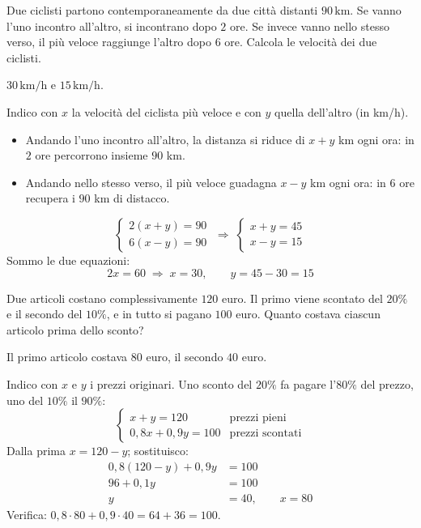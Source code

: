 
\begin{question}[ID=3.9, subtitle={Due ciclisti}, difficulty=difficile, tags={sistemi, problemi, moto}]
Due ciclisti partono contemporaneamente da due città distanti $90\,\text{km}$. Se vanno l'uno incontro all'altro, si incontrano dopo $2$ ore. Se invece vanno nello stesso verso, il più veloce raggiunge l'altro dopo $6$ ore. Calcola le velocità dei due ciclisti.
\begin{solution}
$30\,\text{km/h}$ e $15\,\text{km/h}$.
\end{solution}
\begin{explanation}
Indico con $x$ la velocità del ciclista più veloce e con $y$ quella dell'altro (in km/h).
\begin{itemize}
    \item Andando l'uno incontro all'altro, la distanza si riduce di $x+y$ km ogni ora: in $2$ ore percorrono insieme $90$ km.
    \item Andando nello stesso verso, il più veloce guadagna $x-y$ km ogni ora: in $6$ ore recupera i $90$ km di distacco.
\end{itemize}
\[ \begin{cases} 2(x+y)=90\\ 6(x-y)=90\end{cases} \;\Longrightarrow\; \begin{cases} x+y=45\\ x-y=15\end{cases} \]
Sommo le due equazioni:
\[ 2x=60 \;\Rightarrow\; x=30, \qquad y=45-30=15 \]
\end{explanation}
\end{question}


\begin{question}[ID=3.10, subtitle={Prezzi scontati}, difficulty=difficile, tags={sistemi, problemi, percentuali}]
Due articoli costano complessivamente $120$ euro. Il primo viene scontato del $20\%$ e il secondo del $10\%$, e in tutto si pagano $100$ euro. Quanto costava ciascun articolo prima dello sconto?
\begin{solution}
Il primo articolo costava $80$ euro, il secondo $40$ euro.
\end{solution}
\begin{explanation}
Indico con $x$ e $y$ i prezzi originari. Uno sconto del $20\%$ fa pagare l'$80\%$ del prezzo, uno del $10\%$ il $90\%$:
\[ \begin{cases} x+y=120 & \text{prezzi pieni}\\ 0{,}8x+0{,}9y=100 & \text{prezzi scontati}\end{cases} \]
Dalla prima $x=120-y$; sostituisco:
\[\begin{aligned}
0{,}8(120-y)+0{,}9y &= 100\\
96+0{,}1y &= 100\\
y &= 40, \qquad x=80
\end{aligned}\]
Verifica: $0{,}8\cdot80+0{,}9\cdot40=64+36=100$.
\end{explanation}
\end{question}

